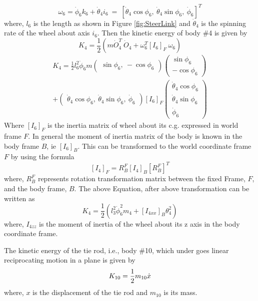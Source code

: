  \begin{equation}
 \omega_6=\dot\phi_6k_6+\dot\theta_4i_6 ~=~ [\dot\theta_4\cos\phi_6,~ \dot\theta_4\sin\phi_6,~ \dot\phi_6]^T
 \end{equation} where, $l_6$ is the length as shown in Figure \ref{fig:SteerLink}  and $\dot\theta_4$ is the spinning rate of the wheel about axis $i_6$.
 Then the kinetic energy of body \#4 is given by
\begin{equation}
 K_4=\frac{1}{2}(m\dot O_4 ^T ~\dot O_4+ \omega_6^T [I_6]_F~\omega_6  )
 \end{equation}
 \begin{multline}
 K_4=\frac{1}{2} l_6^2 \dot\phi_6 m \begin{pmatrix}
 \sin\phi_6, ~ -\cos\phi_6
 \end{pmatrix}
 \begin{pmatrix}
 \sin\phi_6\\ -\cos\phi_6
 \end{pmatrix}\\
 + 
 \begin{pmatrix}
 \dot\theta_4 \cos\phi_6, ~ \dot\theta_4 \sin\phi_6, ~\dot\phi_6
 \end{pmatrix}[I_6]_F
 \begin{pmatrix}
 \dot\theta_4 \cos\phi_6\\ \dot\theta_4 \sin\phi_6\\ \dot\phi_6
 \end{pmatrix}
 \end{multline} Where $[I_6]_F$ is the inertia matrix of wheel about its c.g. expressed in world frame $F$.
 In general the moment of inertia matrix of the body is known in the body frame $B$, ie $[I_6]_B$. This can be transformed to the world coordinate frame $F$ by using the formula
 \[ [I_4]_F=R^F_B[I_4]_B [R^F_B]^T\] where, $R^F_B$ represents rotation transformation matrix between the fixed Frame, $F$, and the body frame, $B$. 
 The above Equation, after above transformation can be written as
 \begin{equation}
 K_4=\frac{1}{2}(l_3^2\dot\phi_6^2m_4+[I_{4xx}]_B\theta_4^2)
 \end{equation} 
where, $I_{4zz} $ is the moment of inertia of the wheel about its z axis in the body coordinate frame.

The kinetic energy of the tie rod, i.e., body \#10, which under goes linear reciprocating motion in a plane is given by
\begin{equation}
K_{10}=\frac{1}{2} m_{10} \dot{x}
\end{equation} where, $x$ is the displacement of the tie rod and $m_{10}$ is its mass.


